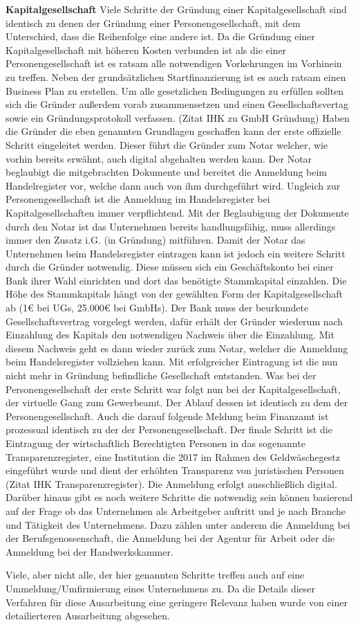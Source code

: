\textbf{Kapitalgesellschaft}
Viele Schritte der Gründung einer Kapitalgesellschaft sind identisch zu denen der Gründung einer Personengesellschaft, mit dem Unterschied, dass die Reihenfolge eine andere ist.
Da die Gründung einer Kapitalgesellschaft mit höheren Kosten verbunden ist als die einer Personengesellschaft ist es ratsam alle notwendigen Vorkehrungen im Vorhinein zu treffen. Neben der grundsätzlichen Startfinanzierung ist es auch ratsam einen Business Plan zu erstellen. Um alle gesetzlichen Bedingungen zu erfüllen sollten sich die Gründer außerdem vorab zusammensetzen und einen Gesellschaftsvertag sowie ein Gründungsprotokoll verfassen. (Zitat IHK zu GmbH Gründung)
Haben die Gründer die eben genannten Grundlagen geschaffen kann der erste offizielle Schritt eingeleitet werden. Dieser führt die Gründer zum Notar welcher, wie vorhin bereits erwähnt, auch digital abgehalten werden kann. Der Notar beglaubigt die mitgebrachten Dokumente und bereitet die Anmeldung beim Handelregister vor, welche dann auch von ihm durchgeführt wird. Ungleich zur Personengesellschaft ist die Anmeldung im Handelsregister bei Kapitalgesellschaften immer verpflichtend. Mit der Beglaubigung der Dokumente durch den Notar ist das Unternehmen bereits handlungsfähig, muss allerdings immer den Zusatz i.G. (in Gründung) mitführen. 
Damit der Notar das Unternehmen beim Handelsregister eintragen kann ist jedoch ein weitere Schritt durch die Gründer notwendig. Diese müssen sich ein Geschäftskonto bei einer Bank ihrer Wahl einrichten und dort das benötigte Stammkapital einzahlen. Die Höhe des Stammkapitals hängt von der gewählten Form der Kapitalgesellschaft ab (1€ bei UGs, 25.000€ bei GmbHs). Der Bank muss der beurkundete Gesellschaftsvertrag vorgelegt werden, dafür erhält der Gründer wiederum nach Einzahlung des Kapitals den notwendigen Nachweis über die Einzahlung. Mit diesem Nachweis geht es dann wieder zurück zum Notar, welcher die Anmeldung beim Handelsregister vollziehen kann. Mit erfolgreicher Eintragung ist die nun nicht mehr in Gründung befindliche Gesellschaft entstanden.
Was bei der Personengesellschaft der erste Schritt war folgt nun bei der Kapitalgesellschaft, der virtuelle Gang zum Gewerbeamt. Der Ablauf dessen ist identisch zu dem der Personengesellschaft. Auch die darauf folgende Meldung beim Finanzamt ist prozessual identisch zu der der Personengesellschaft.
Der finale Schritt ist die Eintragung der wirtschaftlich Berechtigten Personen in das sogenannte Transparenzregister, eine Institution die 2017 im Rahmen des Geldwäschegestz eingeführt wurde und dient der erhöhten Transparenz von juristischen Personen (Zitat IHK Transparenzregister). Die Anmeldung erfolgt ausschließlich digital.
Darüber hinaus gibt es noch weitere Schritte die notwendig sein können basierend auf der Frage ob das Unternehmen als Arbeitgeber auftritt und je nach Branche und Tätigkeit des Unternehmens. Dazu zählen unter anderem die Anmeldung bei der Berufsgenossenschaft, die Anmeldung bei der Agentur für Arbeit oder die Anmeldung bei der Handwerkskammer.

Viele, aber nicht alle, der hier genannten Schritte treffen auch auf eine Ummeldung/Umfirmierung eines Unternehmens zu. Da die Details dieser Verfahren für diese Ausarbeitung eine geringere Relevanz haben wurde von einer detailierteren Ausarbeitung abgesehen.